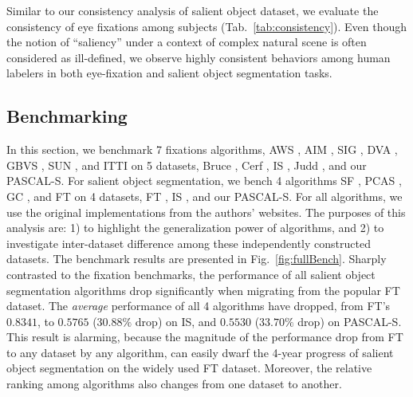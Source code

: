 Similar to our consistency analysis of salient object dataset, we evaluate the consistency of eye fixations among subjects (Tab.~\ref{tab:consistency}).  Even though the notion of ``saliency'' under a context of complex natural scene is often considered as ill-defined, we observe highly consistent behaviors among human labelers in both eye-fixation and salient object segmentation tasks.



\subsection{Benchmarking}\label{sec:benchmarking}
In this section, we benchmark 7 fixations algorithms, AWS \cite{garcia2012relationship}, AIM \cite{bruce2005saliency}, SIG \cite{hou2012image}, DVA \cite{hou2008dynamic}, GBVS \cite{harel2006graph}, SUN \cite{zhang2008sun}, and ITTI \cite{itti1998model} on 5 datasets, Bruce \cite{bruce2005saliency}, Cerf \cite{cerf2008predicting}, IS \cite{li2013visual}, Judd \cite{judd2009learning}, and our PASCAL-S.  For salient object segmentation, we bench 4 algorithms SF \cite{perazzi2012saliency}, PCAS \cite{margolin2013makes}, GC \cite{cheng2011global}, and FT \cite{achanta2009frequency} on 4 datasets, FT \cite{achanta2009frequency}, IS \cite{li2013visual}, and our PASCAL-S.  For all algorithms, we use the original implementations from the authors' websites.  The purposes of this analysis are: 1) to highlight the generalization power of algorithms, and 2) to investigate inter-dataset difference among these independently constructed datasets.  The benchmark results are presented in Fig.~\ref{fig:fullBench}.  Sharply contrasted to the fixation benchmarks, the performance of all salient object segmentation algorithms drop significantly when migrating from the popular FT dataset.  The \emph{average} performance of all 4 algorithms have dropped, from FT's $0.8341$, to $0.5765$ ($30.88\%$ drop) on IS, and $0.5530$ ($33.70\%$ drop) on PASCAL-S.  This result is alarming, because the magnitude of the performance drop from FT to any dataset by any algorithm, can easily dwarf the 4-year progress of salient object segmentation on the widely used FT dataset.  Moreover, the relative ranking among algorithms also changes from one dataset to another.

